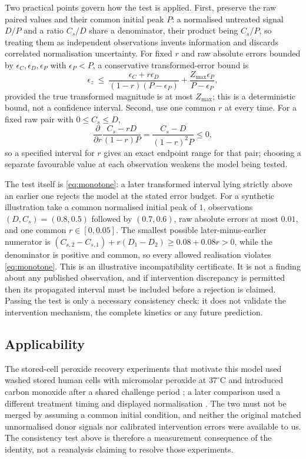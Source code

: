 \documentclass[11pt,a4paper]{article}
\theoremstyle{plain}
\theoremstyle{definition}
\theoremstyle{remark}
\begin{document}
Two practical points govern how the test is applied. First, preserve the raw
paired values and their common initial peak $P$: a normalised untreated signal
$D/P$ and a ratio $C_s/D$ share a denominator, their product being $C_s/P$, so
treating them as independent observations invents information and discards
correlated normalisation uncertainty. For fixed $r$ and raw absolute errors
bounded by $\epsilon_C,\epsilon_D,\epsilon_P$ with $\epsilon_P<P$, a
conservative transformed-error bound is
\begin{equation}\label{eq:errors}
\epsilon_z\ \le\ \frac{\epsilon_C+r\epsilon_D}{(1-r)(P-\epsilon_P)}
+\frac{Z_{\max}\epsilon_P}{P-\epsilon_P},
\end{equation}
provided the true transformed magnitude is at most $Z_{\max}$; this is a
deterministic bound, not a confidence interval. Second, use one common $r$ at
every time. For a fixed raw pair with $0\le C_s\le D$,
\[
\frac{\partial}{\partial r}\frac{C_s-rD}{(1-r)P}=\frac{C_s-D}{(1-r)^2P}\le0 ,
\]
so a specified interval for $r$ gives an exact endpoint range for that pair;
choosing a separate favourable value at each observation weakens the model
being tested.

The test itself is \eqref{eq:monotone}: a later transformed interval lying
strictly above an earlier one rejects the model at the stated error budget. For
a synthetic illustration take a common normalised initial peak of $1$,
observations $(D,C_s)=(0.8,0.5)$ followed by $(0.7,0.6)$, raw absolute errors
at most $0.01$, and one common $r\in[0,0.05]$. The smallest possible
later-minus-earlier numerator is $(C_{s,2}-C_{s,1})+r(D_1-D_2)\ge0.08+0.08r>0$,
while the denominator is positive and common, so every allowed realisation
violates \eqref{eq:monotone}. This is an illustrative incompatibility
certificate. It is not a finding about any published observation, and if
intervention discrepancy is permitted then its propagated interval must be
included before a rejection is claimed. Passing the test is only a necessary
consistency check: it does not validate the intervention mechanism, the
complete kinetics or any future prediction.

\subsection{Applicability}
The stored-cell peroxide recovery experiments that motivate this model used
washed stored human cells with micromolar peroxide at $37^{\circ}$C and
introduced carbon monoxide after a shared challenge period \citep{harper2015};
a later comparison used a different treatment timing and displayed
normalisation \citep{oh2022}. The two must not be merged by assuming a common
initial condition, and neither the original matched unnormalised donor signals
nor calibrated intervention errors were available to us. The consistency test
above is therefore a measurement consequence of the identity, not a reanalysis
claiming to resolve those experiments.
\end{document}
